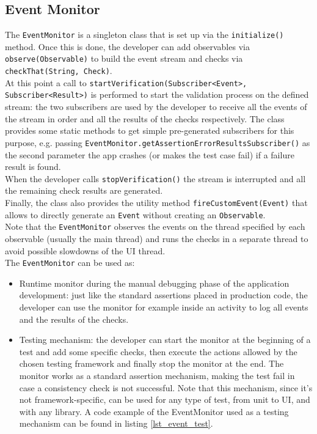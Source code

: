 \documentclass[11pt,a4paper,notitlepage]{article}
\begin{document}
\subsection{Event Monitor}
The \texttt{EventMonitor} is a singleton class that is set up via the \texttt{initialize()} method. Once this is done, the developer can add observables via \texttt{observe(Observable)} to build the event stream and checks via \texttt{checkThat(String, Check)}.\medskip \\
At this point a call to \texttt{startVerification(Subscriber<Event>, Subscriber<Result>)} is performed to start the validation process on the defined stream: the two subscribers are used by the developer to receive all the events of the stream in order and all the results of the checks respectively. The class provides some static methods to get simple pre-generated subscribers for this purpose, e.g. passing \texttt{EventMonitor.getAssertionErrorResultsSubscriber()} as the second parameter the app crashes (or makes the test case fail) if a failure result is found.\medskip \\
When the developer calls \texttt{stopVerification()} the stream is interrupted and all the remaining check results are generated.\medskip \\
Finally, the class also provides the utility method \texttt{fireCustomEvent(Event)} that allows to directly generate an \texttt{Event} without creating an \texttt{Observable}.\medskip \\
Note that the \texttt{EventMonitor} observes the events on the thread specified by each observable (usually the main thread) and runs the checks in a separate thread to avoid possible slowdowns of the UI thread.\medskip \\
The \texttt{EventMonitor} can be used as:
\begin{itemize}
	\item Runtime monitor during the manual debugging phase of the application development: just like the standard assertions placed in production code, the developer can use the monitor for example inside an activity to log all events and the results of the checks.
	\item Testing mechanism: the developer can start the monitor at the beginning of a test and add some specific checks, then execute the actions allowed by the chosen testing framework and finally stop the monitor at the end. The monitor works as a standard assertion mechanism, making the test fail in case a consistency check is not successful. Note that this mechanism, since it's not framework-specific, can be used for any type of test, from unit to UI, and with any library. A code example of the EventMonitor used as a testing mechanism can be found in listing \ref{lst_event_test}.
\end{itemize}
\end{document}
